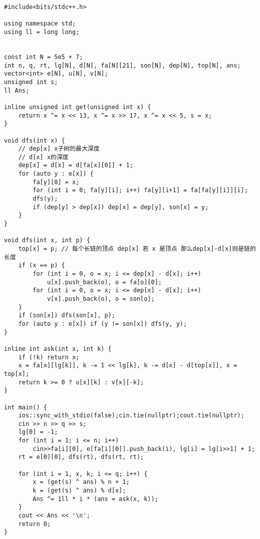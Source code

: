 \begin{verbatim}
#include<bits/stdc++.h>

using namespace std;
using ll = long long;


const int N = 5e5 + 7;
int n, q, rt, lg[N], d[N], fa[N][21], son[N], dep[N], top[N], ans;
vector<int> e[N], u[N], v[N];
unsigned int s;
ll Ans;

inline unsigned int get(unsigned int x) {
    return x ^= x << 13, x ^= x >> 17, x ^= x << 5, s = x; 
}

void dfs(int x) {
    // dep[x] x子树的最大深度
    // d[x] x的深度
    dep[x] = d[x] = d[fa[x][0]] + 1;
    for (auto y : e[x]) {
        fa[y][0] = x;
        for (int i = 0; fa[y][i]; i++) fa[y][i+1] = fa[fa[y][i]][i];
        dfs(y);
        if (dep[y] > dep[x]) dep[x] = dep[y], son[x] = y;
    }
}

void dfs(int x, int p) {
    top[x] = p; // 每个长链的顶点 dep[x] 若 x 是顶点 那么dep[x]-d[x]则是链的长度
    if (x == p) {
        for (int i = 0, o = x; i <= dep[x] - d[x]; i++)
            u[x].push_back(o), o = fa[o][0];
        for (int i = 0, o = x; i <= dep[x] - d[x]; i++)
            v[x].push_back(o), o = son[o];
    }
    if (son[x]) dfs(son[x], p);
    for (auto y : e[x]) if (y != son[x]) dfs(y, y);
}

inline int ask(int x, int k) {
    if (!k) return x;
    x = fa[x][lg[k]], k -= 1 << lg[k], k -= d[x] - d[top[x]], x = top[x];
    return k >= 0 ? u[x][k] : v[x][-k];
}

int main() {
    ios::sync_with_stdio(false);cin.tie(nullptr);cout.tie(nullptr);
    cin >> n >> q >> s;
    lg[0] = -1;
    for (int i = 1; i <= n; i++)
        cin>>fa[i][0], e[fa[i][0]].push_back(i), lg[i] = lg[i>>1] + 1;
    rt = e[0][0], dfs(rt), dfs(rt, rt);
    
    for (int i = 1, x, k; i <= q; i++) {
        x = (get(s) ^ ans) % n + 1;
        k = (get(s) ^ ans) % d[x];
        Ans ^= 1ll * i * (ans = ask(x, k));
    }
    cout << Ans << '\n';
    return 0;
}
\end{verbatim}